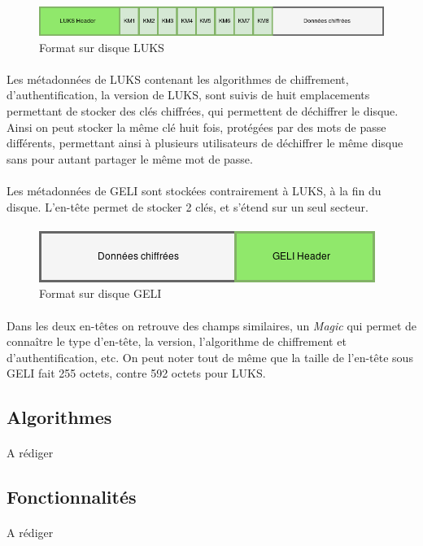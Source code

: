 \paragraph{}
\begin{figure}[h]
\centering
\includegraphics[width=.8\linewidth]{etat_art/format_disque_luks.png}
\caption{\label{fig:LUKSFormat}Format sur disque LUKS}
\end{figure}

\paragraph{}
Les métadonnées de LUKS contenant les algorithmes de chiffrement, 
d'authentification, la version de LUKS, sont suivis de huit emplacements 
permettant de stocker des clés chiffrées, qui permettent de déchiffrer le 
disque. Ainsi on peut stocker la même clé huit fois, protégées par des mots de 
passe différents, permettant ainsi à plusieurs utilisateurs de déchiffrer le 
même disque sans pour autant partager le même mot de passe.

\paragraph{}
Les métadonnées de GELI sont stockées contrairement à LUKS, à la fin du disque.
L'en-tête permet de stocker 2 clés, et s'étend sur un seul secteur.


\paragraph{}
\begin{figure}[h]
\centering
\includegraphics[width=.5\linewidth]{etat_art/format_disque_geli.png}
\caption{\label{fig:LUKSFormat}Format sur disque GELI}
\end{figure}

\paragraph{}
Dans les deux en-têtes on retrouve des champs similaires, un {\em Magic} qui 
permet de connaître le type d'en-tête, la version, l'algorithme de chiffrement 
et d'authentification, etc. On peut noter tout de même que la taille de 
l'en-tête sous GELI fait 255 octets, contre 592 octets pour LUKS.



\subsection{Algorithmes}
\paragraph*{} A rédiger
\subsection{Fonctionnalités}
\paragraph*{} A rédiger
